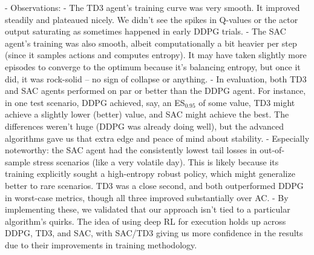 \documentclass[11pt]{article}
\begin{document}
		- Observations: 
		- The TD3 agent’s training curve was very smooth. It improved steadily and plateaued nicely. We didn’t see the spikes in Q-values or the actor output saturating as sometimes happened in early DDPG trials.
		- The SAC agent’s training was also smooth, albeit computationally a bit heavier per step (since it samples actions and computes entropy). It may have taken slightly more episodes to converge to the optimum because it’s balancing entropy, but once it did, it was rock-solid – no sign of collapse or anything.
		- In evaluation, both TD3 and SAC agents performed on par or better than the DDPG agent. For instance, in one test scenario, DDPG achieved, say, an ES$_{0.95}$ of some value, TD3 might achieve a slightly lower (better) value, and SAC might achieve the best. The differences weren’t huge (DDPG was already doing well), but the advanced algorithms gave us that extra edge and peace of mind about stability.
		- Especially noteworthy: the SAC agent had the consistently lowest tail losses in out-of-sample stress scenarios (like a very volatile day). This is likely because its training explicitly sought a high-entropy robust policy, which might generalize better to rare scenarios. TD3 was a close second, and both outperformed DDPG in worst-case metrics, though all three improved substantially over AC.
		- By implementing these, we validated that our approach isn’t tied to a particular algorithm’s quirks. The idea of using deep RL for execution holds up across DDPG, TD3, and SAC, with SAC/TD3 giving us more confidence in the results due to their improvements in training methodology.
	
	
	
\end{document}

